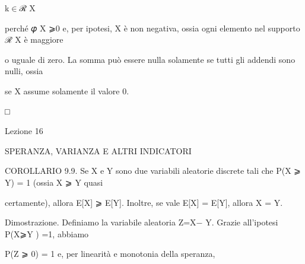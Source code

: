 \documentclass[a4paper,portrait,12pt]{article}
\begin{document}
\begin{flushleft}
k$\in$ℛ X
\end{flushleft}





\begin{flushleft}
perch\'{e} 𝜑 X ⩾0 e, per ipotesi, X \`{e} non negativa, ossia ogni elemento nel supporto ℛ X \`{e} maggiore
\end{flushleft}


\begin{flushleft}
o uguale di zero. La somma pu\`{o} essere nulla solamente se tutti gli addendi sono nulli, ossia
\end{flushleft}


\begin{flushleft}
se X assume solamente il valore 0.
\end{flushleft}


□





\begin{flushleft}
Lezione 16
\end{flushleft}










\begin{flushleft}
SPERANZA, VARIANZA E ALTRI INDICATORI
\end{flushleft}





\begin{flushleft}
COROLLARIO 9.9. Se X e Y sono due variabili aleatorie discrete tali che P(X ⩾ Y) = 1 (ossia X ⩾ Y quasi
\end{flushleft}


\begin{flushleft}
certamente), allora E[X] ⩾ E[Y]. Inoltre, se vale E[X] = E[Y], allora X = Y.
\end{flushleft}


\begin{flushleft}
Dimostrazione. Definiamo la variabile aleatoria Z=X$-$ Y. Grazie all'ipotesi P(X⩾Y ) =1, abbiamo
\end{flushleft}


\begin{flushleft}
P(Z ⩾ 0) = 1 e, per linearit\`{a} e monotonia della speranza,
\end{flushleft}
\end{document}
